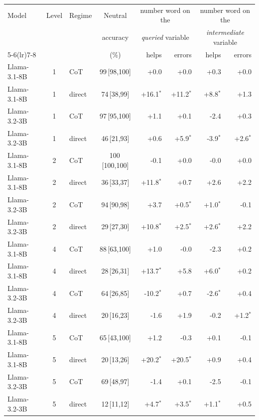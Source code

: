 \begin{tabular}{lclcrrrr}
\toprule
Model & Level & Regime & Neutral & \multicolumn{2}{c}{number word on the} & \multicolumn{2}{c}{number word on the} \\
& & & accuracy & \multicolumn{2}{c}{\emph{queried} variable} & \multicolumn{2}{c}{\emph{intermediate} variable} \\
\cmidrule(lr){5-6}\cmidrule(lr){7-8}
& & & (\%) & helps & errors & helps & errors \\
\midrule
Llama-3.1-8B & 1 & CoT & 99\,{\scriptsize[98,100]} & +0.0 & +0.0 & +0.3 & +0.0 \\
Llama-3.1-8B & 1 & direct & 74\,{\scriptsize[38,99]} & +16.1$^{*}$ & +11.2$^{*}$ & +8.8$^{*}$ & +1.3 \\
\addlinespace
Llama-3.2-3B & 1 & CoT & 97\,{\scriptsize[95,100]} & +1.1 & +0.1 & -2.4 & +0.3 \\
Llama-3.2-3B & 1 & direct & 46\,{\scriptsize[21,93]} & +0.6 & +5.9$^{*}$ & -3.9$^{*}$ & +2.6$^{*}$ \\
\addlinespace
Llama-3.1-8B & 2 & CoT & 100\,{\scriptsize[100,100]} & -0.1 & +0.0 & -0.0 & +0.0 \\
Llama-3.1-8B & 2 & direct & 36\,{\scriptsize[33,37]} & +11.8$^{*}$ & +0.7 & +2.6 & +2.2 \\
\addlinespace
Llama-3.2-3B & 2 & CoT & 94\,{\scriptsize[90,98]} & +3.7 & +0.5$^{*}$ & +1.0$^{*}$ & -0.1 \\
Llama-3.2-3B & 2 & direct & 29\,{\scriptsize[27,30]} & +10.8$^{*}$ & +2.5$^{*}$ & +2.6$^{*}$ & +2.2 \\
\addlinespace
Llama-3.1-8B & 4 & CoT & 88\,{\scriptsize[63,100]} & +1.0 & -0.0 & -2.3 & +0.2 \\
Llama-3.1-8B & 4 & direct & 28\,{\scriptsize[26,31]} & +13.7$^{*}$ & +5.8 & +6.0$^{*}$ & +0.2 \\
\addlinespace
Llama-3.2-3B & 4 & CoT & 64\,{\scriptsize[26,85]} & -10.2$^{*}$ & +0.7 & -2.6$^{*}$ & +0.4 \\
Llama-3.2-3B & 4 & direct & 20\,{\scriptsize[16,23]} & -1.6 & +1.9 & -0.2 & +1.2$^{*}$ \\
\addlinespace
Llama-3.1-8B & 5 & CoT & 65\,{\scriptsize[43,100]} & +1.2 & -0.3 & +0.1 & -0.1 \\
Llama-3.1-8B & 5 & direct & 20\,{\scriptsize[13,26]} & +20.2$^{*}$ & +20.5$^{*}$ & +0.9 & +0.4 \\
\addlinespace
Llama-3.2-3B & 5 & CoT & 69\,{\scriptsize[48,97]} & -1.4 & +0.1 & -2.5 & -0.1 \\
Llama-3.2-3B & 5 & direct & 12\,{\scriptsize[11,12]} & +4.7$^{*}$ & +3.5$^{*}$ & +1.1$^{*}$ & +0.5 \\
\bottomrule
\end{tabular}
